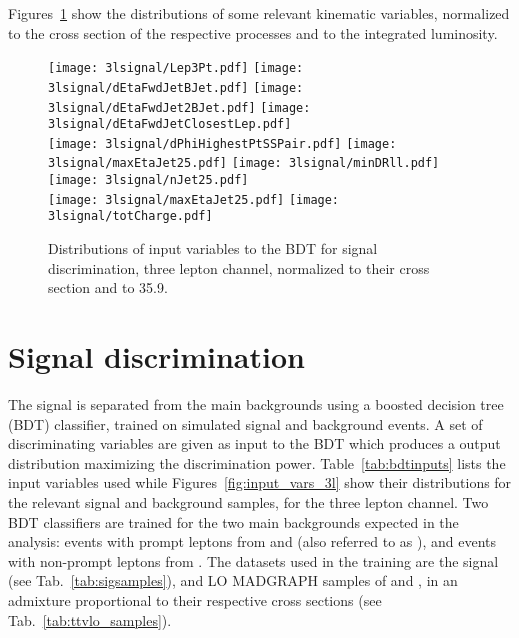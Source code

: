 Figures~\ref{fig:input_vars_3l_xsec} show the distributions of some relevant kinematic variables, normalized to the cross section of the respective processes and to the integrated luminosity.
\begin{figure} [!h]
 \centering
 \texttt{[image: 3lsignal/Lep3Pt.pdf]} 
 \texttt{[image: 3lsignal/dEtaFwdJetBJet.pdf]}
 \texttt{[image: 3lsignal/dEtaFwdJet2BJet.pdf]}
 \texttt{[image: 3lsignal/dEtaFwdJetClosestLep.pdf]} \\
 \texttt{[image: 3lsignal/dPhiHighestPtSSPair.pdf]}
 \texttt{[image: 3lsignal/maxEtaJet25.pdf]}
 \texttt{[image: 3lsignal/minDRll.pdf]}
 \texttt{[image: 3lsignal/nJet25.pdf]} \\
 \texttt{[image: 3lsignal/maxEtaJet25.pdf]}
 \texttt{[image: 3lsignal/totCharge.pdf]}
\caption[Input variables to the BDT for signal discrimination normalized.]{Distributions of input variables to the BDT for signal discrimination, three lepton channel, normalized to their cross section and to 35.9\fbinv.} 
\label{fig:input_vars_3l_xsec}
\end{figure}    

\section{Signal discrimination }
\label{secc:signal_disc}

The \tHq signal is separated from the main backgrounds using a boosted decision tree (BDT) classifier, trained on simulated signal and background events. A set of discriminating variables are given as input to the BDT which produces a output distribution maximizing the discrimination power. Table~\ref{tab:bdtinputs} lists the input variables used while Figures~\ref{fig:input_vars_3l} show their distributions for the relevant signal and background samples, for the three lepton channel. Two BDT classifiers are trained for the two main backgrounds expected in the analysis: events with prompt leptons from \ttW and \ttZ (also referred to as \ttV), and events with non-prompt leptons from \ttbar. The datasets used in the training are the \tHq signal (see Tab.~\ref{tab:sigsamples}), and LO MADGRAPH samples of \ttW and \ttZ, in an admixture proportional to their respective cross sections (see Tab.~\ref{tab:ttvlo_samples}).

